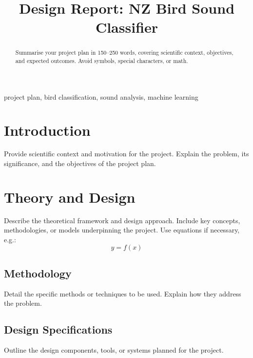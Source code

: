 \documentclass[conference,a4paper]{IEEEtran}
\begin{document}
\title{Design Report: NZ Bird Sound Classifier}

\author{
}

\maketitle

\begin{abstract}
Summarise your project plan in 150–250 words, covering scientific context, objectives, and expected outcomes. Avoid symbols, special characters, or math.
\end{abstract}

\begin{IEEEkeywords}
project plan, bird classification, sound analysis, machine learning
\end{IEEEkeywords}

\section{Introduction}
Provide scientific context and motivation for the project. Explain the problem, its significance, and the objectives of the project plan.

\section{Theory and Design}
Describe the theoretical framework and design approach. Include key concepts, methodologies, or models underpinning the project. Use equations if necessary, e.g.:
\begin{equation}
y = f(x) \label{eq:example}
\end{equation}

\subsection{Methodology}
Detail the specific methods or techniques to be used. Explain how they address the problem.

\subsection{Design Specifications}
Outline the design components, tools, or systems planned for the project.
\end{document}
